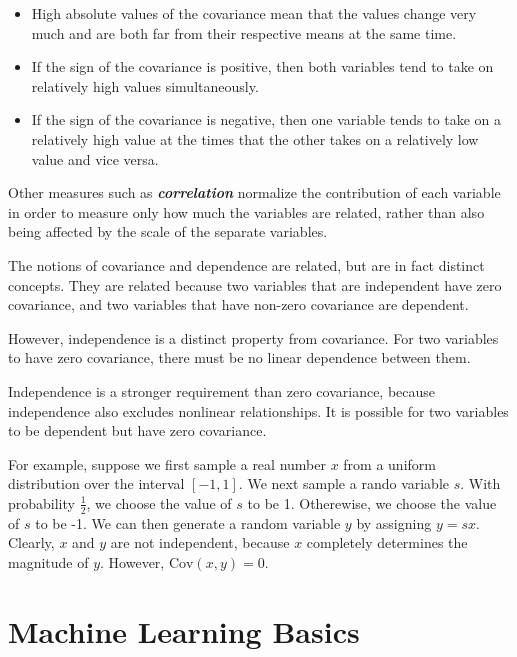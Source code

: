 \documentclass{report}
\begin{document}
\begin{itemize}
    \item High absolute values of the covariance mean that the values change very much and are both far from their respective means at the same time.
    \item If the sign of the covariance is positive, then both variables tend to take on relatively high values simultaneously.
    \item If the sign of the covariance is negative, then one variable tends to take on a relatively high value at the times that the other takes on a relatively low value and vice versa.
\end{itemize}
Other measures such as \textbf{\textit{correlation}} normalize the contribution of each variable in order to measure only how much the variables are related, rather than also being affected by the scale of the separate variables.\newline

\noindent The notions of covariance and dependence are related, but are in fact distinct concepts. They are related because two variables that are independent have zero covariance, and two variables that have non-zero covariance are dependent.\newline

\noindent However, independence is a distinct property from covariance. For two variables to have zero covariance, there must be no linear dependence between them. 

Independence is a stronger requirement than zero covariance, because independence also excludes nonlinear relationships. It is possible for two variables to be dependent but have zero covariance.

For example, suppose we first sample a real number $x$ from a uniform distribution over the interval $[-1, 1]$. We next sample a rando variable $s$. With probability $\frac{1}{2}$, we choose the value of $s$ to be 1. Otherewise, we choose the value of $s$ to be -1. We can then generate a random variable $y$ by assigning $y=sx$. Clearly, $x$ and $y$ are not independent, because $x$ completely determines the magnitude of $y$. However, $\text{Cov}(x,y)=0$.





\chapter{Machine Learning Basics}
\end{document}

